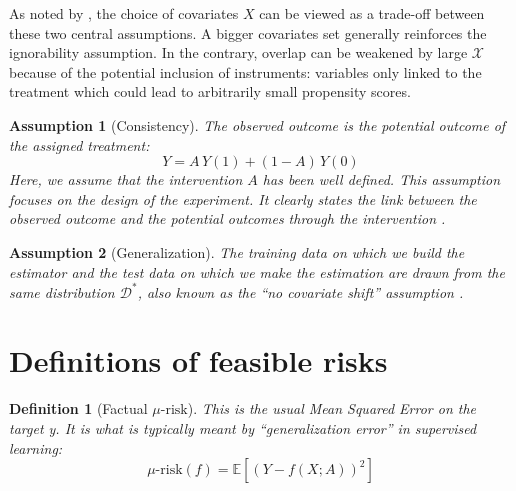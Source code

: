 \documentclass[11pt]{article}
\let\cite=\supercite
\newtheorem{definition}{Definition}
\newtheorem{assumption}{Assumption}
\begin{document}
As noted by \cite{damour_overlap_2020}, the choice of covariates $X$ can
be viewed as a trade-off between these two central assumptions. A bigger
covariates set generally reinforces the ignorability assumption. In the
contrary, overlap can be weakened by large $\mathcal{X}$ because of the
potential inclusion of instruments: variables only linked to the treatment which
could lead to arbitrarily small propensity scores.


\begin{assumption}[Consistency]\label{assumption:consistency} The observed
    outcome is the potential outcome of the assigned treatment:
    \begin{equation*}\label{eq:consistancy}
        Y = A \, Y(1) + (1-A) \, Y(0)
    \end{equation*}
    Here, we assume that the intervention $A$ has been well defined. This
    assumption focuses on the design of the experiment. It clearly states the link
    between the observed outcome and the potential outcomes through the
    intervention \cite{hernan_causal_2020}.
\end{assumption}

\begin{assumption}[Generalization]\label{assumption:generalization} The training
    data on which we build the estimator and the test data on which we make the
    estimation are drawn from the same distribution $\mathcal D^*$, also known as
    the ``no covariate shift'' assumption \cite{jesson_identifying_2020}.
\end{assumption}

\section{Definitions of feasible risks}\label{def:feasible_risks}


\begin{definition}[Factual $\mu\text{-risk}$]\label{def:mu_risk}
    \cite{shalit_estimating_2017} This is the usual Mean Squared Error on
    the target y. It is what is typically meant by ``generalization error'' in
    supervised learning:
    \begin{equation*}\label{eq:mu_risk}
        \mu\text{-risk}(f)=\mathbb{E}\left[(Y-f(X ; A))^2 \right]
    \end{equation*}
\end{definition}
\end{document}
